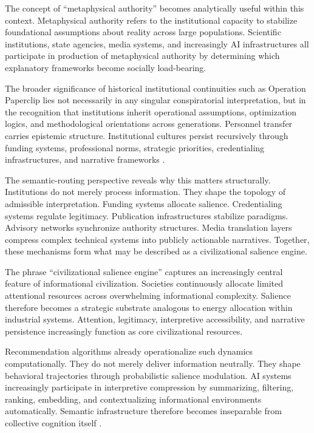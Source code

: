 \documentclass[11pt,a4paper]{article}
\begin{document}
The concept of ``metaphysical authority'' becomes analytically useful within this context. Metaphysical authority refers to the institutional capacity to stabilize foundational assumptions about reality across large populations. Scientific institutions, state agencies, media systems, and increasingly AI infrastructures all participate in production of metaphysical authority by determining which explanatory frameworks become socially load-bearing.

The broader significance of historical institutional continuities such as Operation Paperclip lies not necessarily in any singular conspiratorial interpretation, but in the recognition that institutions inherit operational assumptions, optimization logics, and methodological orientations across generations. Personnel transfer carries epistemic structure. Institutional cultures persist recursively through funding systems, professional norms, strategic priorities, credentialing infrastructures, and narrative frameworks \cite{latour2005}.

The semantic-routing perspective reveals why this matters structurally. Institutions do not merely process information. They shape the topology of admissible interpretation. Funding systems allocate salience. Credentialing systems regulate legitimacy. Publication infrastructures stabilize paradigms. Advisory networks synchronize authority structures. Media translation layers compress complex technical systems into publicly actionable narratives. Together, these mechanisms form what may be described as a civilizational salience engine.

The phrase ``civilizational salience engine'' captures an increasingly central feature of informational civilization. Societies continuously allocate limited attentional resources across overwhelming informational complexity. Salience therefore becomes a strategic substrate analogous to energy allocation within industrial systems. Attention, legitimacy, interpretive accessibility, and narrative persistence increasingly function as core civilizational resources.

Recommendation algorithms already operationalize such dynamics computationally. They do not merely deliver information neutrally. They shape behavioral trajectories through probabilistic salience modulation. AI systems increasingly participate in interpretive compression by summarizing, filtering, ranking, embedding, and contextualizing informational environments automatically. Semantic infrastructure therefore becomes inseparable from collective cognition itself \cite{zuboff2019}.
\end{document}
